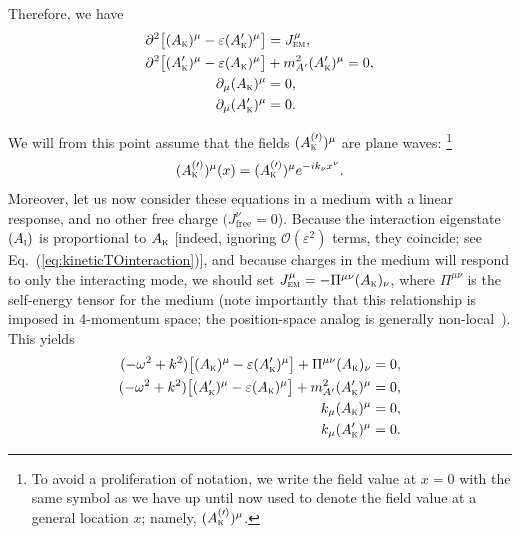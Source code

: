 \documentclass[amsmath,amssymb,aps,10pt,prd,letterpaper,nofootinbib,balancelastpage,notitlepage,superscriptaddress,twocolumn,floatfix]{revtex4-2}
\renewcommand{\eqref}[2][]{Eq{#1}.~(\ref{eq:#2})}	%
\newcommand{\kin}[1]{({#1}_{\textsc{k}})}
\newcommand{\primekin}[1]{({#1}_{\textsc{k}}^\prime)}
\newcommand{\inter}[1]{({#1}_{\textsc{i}})}
\begin{document}
Therefore, we have
\begin{align}
    \partial^2 \big[ \kin{A}^{\mu} - \varepsilon \primekin{A}^{\mu} \big] &= J_{\textsc{em}}^{\mu},  \label{eq:eomAkin1} \\
    \partial^2 \big[ \primekin{A}^{\mu} - \varepsilon \kin{A}^{\mu} \big] &+ m_{A'}^2 \primekin{A}^{\mu} = 0,   \label{eq:eomAkin2} \\
    \partial_\mu \kin{A}^\mu &=0, \\
    \partial_\mu \primekin{A}^\mu &=0.
\end{align}

We will from this point assume that the fields $(A^{(\prime)}_{\textsc{k}})^\mu$ are plane waves:%
\footnote{\label{ftnt:notation}%
    To avoid a proliferation of notation, we write the field value at $x=0$ with the same symbol as we have up until now used to denote the field value at a general location $x$; namely, $(A^{(\prime)}_{\textsc{k}})^\mu$.
} %
\begin{align}
    (A^{(\prime)}_{\textsc{k}})^\mu(x) = (A^{(\prime)}_{\textsc{k}})^\mu e^{-ik_\nu x^\nu}.
\end{align}
Moreover, let us now consider these equations in a medium with a linear response, and no other free charge $(J_{\text{free}}^\nu = 0$).
Because the interaction eigenstate $\inter{A}$ is proportional to $A_{\textsc{k}}$ [indeed, ignoring $\mathcal{O}(\varepsilon^2)$ terms, they coincide; see \eqref{kineticTOinteraction}], and because charges in the medium will respond to only the interacting mode, we should set $J_{\textsc{em}}^{\mu} = - \Pi^{\mu\nu} \kin{A}_\nu$, where $\Pi^{\mu\nu}$ is the self-energy tensor for the medium (note importantly that this relationship is imposed in 4-momentum space; the position-space analog is generally non-local~\cite{Raffelt:1996wa}).
This yields
\begin{align}
    (-\omega^2 + k^2 ) \big[ \kin{A}^{\mu} - \varepsilon \primekin{A}^{\mu} \big] + \Pi^{\mu\nu} \kin{A}_\nu &=0,  \label{eq:eomAkinLinResp1} \\
    (-\omega^2 + k^2 ) \big[ \primekin{A}^{\mu} - \varepsilon \kin{A}^{\mu} \big] + m_{A'}^2 \primekin{A}^{\mu} &= 0,   \label{eq:eomAkinLinResp2} \\
    k_\mu \kin{A}^\mu &=0,  \label{eq:eomAkinLinResp3}\\
    k_\mu \primekin{A}^\mu &=0. \label{eq:eomAkinLinResp4}
\end{align}
\end{document}
